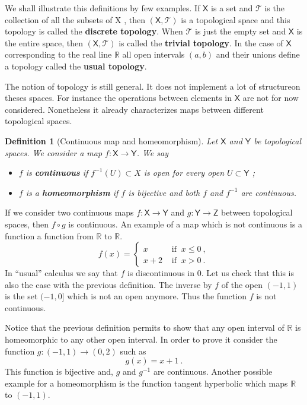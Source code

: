 \documentclass[11pt]{book}
\newcommand{\Tcal}{\mathcal{T}}
\newcommand{\Rbb}{\mathbb{R}}
\newcommand{\Xsf}{\mathsf{X}}
\newcommand{\Ysf}{\mathsf{Y}}
\newcommand{\Zsf}{\mathsf{Z}}
\theoremstyle{break}
\newtheorem{definition}{Definition}[chapter]
\begin{document}
\bigskip


We shall illustrate this definitions by few examples. If $\Xsf$ is a set and $\Tcal$ is the collection of all the subsets of X , then $(\Xsf,\Tcal)$ is a topological space and this topology is called the \textbf{discrete topology}. When $\Tcal$ is just the empty set and $\Xsf$ is the entire space, then $(\Xsf,\Tcal)$ is called the \textbf{trivial topology}. In the case of $\Xsf$ corresponding to the real line $\Rbb$ all open intervals $(a,b)$ and their unions define a topology called the \textbf{usual topology}. 


\bigskip


The notion of topology is still general. It does not implement a lot of structureon theses spaces. For instance the operations between elements in $\Xsf$ are not for now considered. Nonetheless it already characterizes maps between different topological spaces.


\begin{definition}[Continuous map and homeomorphism]
%
Let $\Xsf$ and $\Ysf$ be topological spaces. We consider a map $f : \Xsf \to \Ysf$. We say
%
\begin{itemize}
\item $f$ is \textbf{continuous} if $f^{-1}(U) \subset X$ is open for every open $U \subset\Ysf$ ;
\item $f$ is a \textbf{homeomorphism} if $f$ is bijective and both $f$ and $f^{-1}$ are continuous.
\end{itemize}
%
\end{definition}


If we consider two continuous maps $f : \Xsf \to \Ysf$ and $g : \Ysf \to \Zsf$ between topological spaces, then $f \circ g$ is continuous. An example of a map which is not continuous is a function a function from $\Rbb$ to $\Rbb$.
%
\begin{equation*}
f(x) = \left\{
\begin{array}{ll}
x & \mbox{ if } \ x \leq 0 \ , \\
x + 2 & \mbox{ if } \ x > 0 \ .
\end{array}
\right.
\end{equation*}
%
In ``usual'' calculus we say that $f$ is discontinuous in $0$. Let us check that this is also the case with the previous definition. The inverse by $f$ of the open $(-1,1)$ is the set $(-1,0]$ which is not an open anymore. Thus the function $f$ is not continuous.


Notice that the previous definition permits to show that any open interval of $\Rbb$ is homeomorphic to any other open interval. In order to prove it consider the function $g : (-1,1) \to (0,2)$ such as
%
\begin{equation*}
g(x) = x + 1 \ . 
\end{equation*}
%
This function is bijective and, $g$ and $g^{-1}$ are continuous. Another possible example for a homeomorphism is the function tangent hyperbolic which maps $\Rbb$ to $(-1,1)$.
\end{document}
